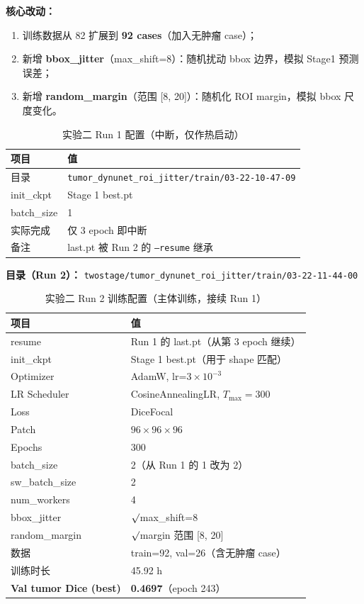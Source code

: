\documentclass{article}
\begin{document}
	\noindent\textbf{核心改动：}
	\begin{enumerate}
		\item 训练数据从 82 扩展到 \textbf{92 cases}（加入无肿瘤 case）；
		\item 新增 \textbf{bbox\_jitter}（max\_shift=8）：随机扰动 bbox 边界，模拟 Stage1 预测误差；
		\item 新增 \textbf{random\_margin}（范围 [8, 20]）：随机化 ROI margin，模拟 bbox 尺度变化。
	\end{enumerate}
	
	\begin{table}[H]
		\centering
		\caption{实验二 Run 1 配置（中断，仅作热启动）}
		\begin{tabular}{ll}
			\hline
			\textbf{项目} & \textbf{值} \\
			\hline
			目录        & \texttt{tumor\_dynunet\_roi\_jitter/train/03-22-10-47-09} \\
			init\_ckpt  & Stage 1 best.pt \\
			batch\_size & 1 \\
			实际完成    & 仅 3 epoch 即中断 \\
			备注        & last.pt 被 Run 2 的 \texttt{--resume} 继承 \\
			\hline
		\end{tabular}
	\end{table}
	
	\noindent\textbf{目录（Run 2）：} \texttt{twostage/tumor\_dynunet\_roi\_jitter/train/03-22-11-44-00}
	
	\begin{table}[H]
		\centering
		\caption{实验二 Run 2 训练配置（主体训练，接续 Run 1）}
		\begin{tabular}{ll}
			\hline
			\textbf{项目} & \textbf{值} \\
			\hline
			resume          & Run 1 的 last.pt（从第 3 epoch 继续） \\
			init\_ckpt      & Stage 1 best.pt（用于 shape 匹配） \\
			Optimizer       & AdamW, lr=$3\times10^{-3}$ \\
			LR Scheduler    & CosineAnnealingLR, $T_{\max}=300$ \\
			Loss            & DiceFocal \\
			Patch           & $96\times96\times96$ \\
			Epochs          & 300 \\
			batch\_size     & 2（从 Run 1 的 1 改为 2） \\
			sw\_batch\_size & 2 \\
			num\_workers    & 4 \\
			bbox\_jitter    & $\surd$\quad max\_shift=8 \\
			random\_margin  & $\surd$\quad margin 范围 [8, 20] \\
			数据            & train=92, val=26（含无肿瘤 case） \\
			训练时长        & 45.92 h \\
			\hline
			\textbf{Val tumor Dice (best)} & \textbf{0.4697}（epoch 243） \\
			\hline
		\end{tabular}
	\end{table}
	
\end{document}
